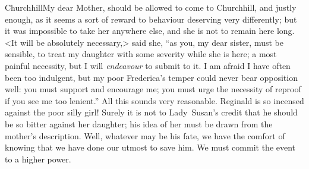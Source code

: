 \begin{mail}{Churchhill}{My dear Mother,}
should be allowed to come to Churchhill, and justly enough, as it seems a sort of reward to behaviour deserving very differently; but it was impossible to take her anywhere else, and she is not to remain here long. <It will be absolutely necessary,> said she, “as you, my dear sister, must be sensible, to treat my daughter with some severity while she is here; a most painful necessity, but I will \textit{endeavour} to submit to it. I am afraid I have often been too indulgent, but my poor Frederica's temper could never bear opposition well: you must support and encourage me; you must urge the necessity of reproof if you see me too lenient.” All this sounds very reasonable. Reginald is so incensed against the poor silly girl! Surely it is not to Lady~Susan's credit that he should be so bitter against her daughter; his idea of her must be drawn from the mother's description. Well, whatever may be his fate, we have the comfort of knowing that we have done our utmost to save him. We must commit the event to a higher power. 

\end{mail}